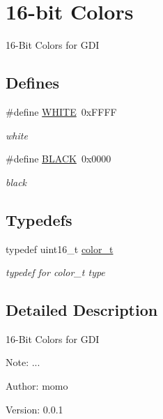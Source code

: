 \hypertarget{group__hgdi__colors16}{
\section{16-bit Colors}
\label{group__hgdi__colors16}
}
16-Bit Colors for GDI  


\subsection*{Defines}
\begin{CompactItemize}
\item 
\hypertarget{group__hgdi__colors16_g87b537f5fa5c109d3c05c13d6b18f382}{
\#define \hyperlink{group__hgdi__colors16_g87b537f5fa5c109d3c05c13d6b18f382}{WHITE}~0xFFFF}
\label{group__hgdi__colors16_g87b537f5fa5c109d3c05c13d6b18f382}

\begin{CompactList}\small\item\em white \item\end{CompactList}\item 
\hypertarget{group__hgdi__colors16_g7b3b25cba33b07c303f3060fe41887f6}{
\#define \hyperlink{group__hgdi__colors16_g7b3b25cba33b07c303f3060fe41887f6}{BLACK}~0x0000}
\label{group__hgdi__colors16_g7b3b25cba33b07c303f3060fe41887f6}

\begin{CompactList}\small\item\em black \item\end{CompactList}\end{CompactItemize}
\subsection*{Typedefs}
\begin{CompactItemize}
\item 
\hypertarget{group__hgdi__colors16_g1fb59ae1391d527c0bd119b5a95fb8a1}{
typedef uint16\_\-t \hyperlink{group__hgdi__colors16_g1fb59ae1391d527c0bd119b5a95fb8a1}{color\_\-t}}
\label{group__hgdi__colors16_g1fb59ae1391d527c0bd119b5a95fb8a1}

\begin{CompactList}\small\item\em typedef for color\_\-t type \item\end{CompactList}\end{CompactItemize}


\subsection{Detailed Description}
16-Bit Colors for GDI 

\begin{Desc}
\item[Note:]... \end{Desc}
\begin{Desc}
\item[Author:]momo \end{Desc}
\begin{Desc}
\item[Version:]0.0.1 \end{Desc}
